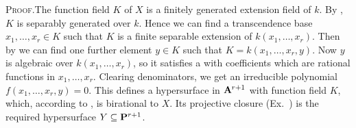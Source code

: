 {\smallskip
\noindent\textsc{Proof.}\enspace The function field $K$ of $X$ is a finitely generated extension field of $k$. By , $K$ is separably generated over $k$. Hence we can find a transcendence base $x_1,\ldots,x_r\in K$ such that $K$ is a finite separable extension of $k(x_1,\ldots,x_r)$. Then by  we can find one further element $y\in K$ such that $K=k(x_1,\ldots,x_r,y)$. Now $y$ is algebraic over $k(x_1,\ldots,x_r)$, so it satisfies a \hypertarget{err-I-4.9}{} with coefficients which are rational functions in $x_1,\ldots,x_r$. Clearing denominators, we get an irreducible polynomial $f(x_1,\ldots,x_r,y)=0$. This defines a hypersurface in $\AffSpace{r+1}$ with function field $K$, which, according to , is birational to $X$. Its projective closure (Ex.~) is the required hypersurface $Y\subseteq\mathbf{P}^{r+1}$.%
}
